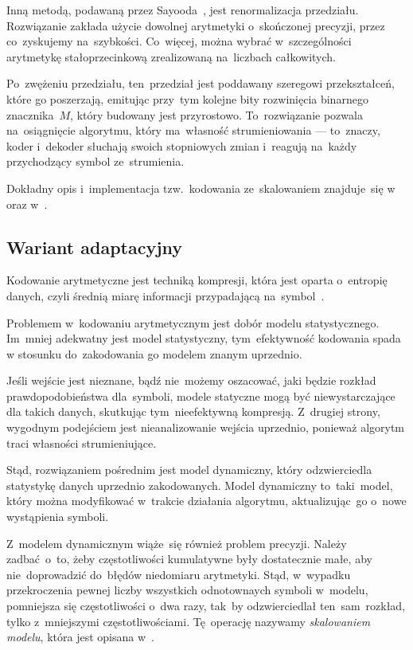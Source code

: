 \documentclass[../../praca.tex]{subfiles}
\begin{document}
Inną metodą, podawaną przez Sayooda~\cite{Sayood:IDC}, jest renormalizacja przedziału.
Rozwiązanie zakłada użycie dowolnej arytmetyki o~skończonej precyzji, przez 
co~zyskujemy na~szybkości. Co~więcej, można wybrać w~szczególności arytmetykę stałoprzecinkową zrealizowaną 
na~liczbach całkowitych. 

Po~zwężeniu przedziału, ten~przedział jest poddawany
szeregowi przekształceń, które go poszerzają, emitując przy~tym kolejne bity
rozwinięcia binarnego znacznika~\( M \), który budowany jest przyrostowo.
To~rozwiązanie pozwala na~osiągnięcie algorytmu, który ma~własność strumieniowania
--- to~znaczy, koder i~dekoder słuchają swoich stopniowych zmian i~reagują na~każdy
przychodzący symbol ze~strumienia. 

Dokładny opis i~implementacja tzw.~kodowania ze~skalowaniem znajduje~się 
w~\cite{Sayood:IDC} oraz w~\cite{Witten:AC}.

\subsection{Wariant adaptacyjny}

Kodowanie arytmetyczne jest techniką kompresji, która jest oparta o~entropię danych,
czyli średnią miarę informacji przypadającą na~symbol~\cite{Sayood:IDC}. 

Problemem w~kodowaniu arytmetycznym jest dobór modelu statystycznego. 
Im~mniej adekwatny jest model statystyczny, tym~efektywność kodowania
spada w stosunku do~zakodowania go modelem znanym uprzednio. 

Jeśli wejście jest nieznane, bądź nie~możemy oszacować, jaki
będzie rozkład prawdopodobieństwa dla~symboli, modele statyczne
mogą być niewystarczające dla takich danych, skutkując tym~nieefektywną kompresją.
Z~drugiej strony, wygodnym podejściem jest nieanalizowanie wejścia uprzednio, ponieważ
algorytm traci własności strumieniujące.

Stąd, rozwiązaniem pośrednim jest model dynamiczny, który odzwierciedla 
statystykę danych uprzednio zakodowanych. Model dynamiczny to~taki~model,
który można modyfikować w~trakcie działania algorytmu, aktualizując~go
o~nowe wystąpienia symboli. 

Z~modelem dynamicznym wiąże~się również problem precyzji. Należy zadbać~o~to, 
żeby częstotliwości kumulatywne były dostatecznie małe, aby
nie~doprowadzić do~błędów niedomiaru arytmetyki. Stąd, w~wypadku
przekroczenia pewnej liczby wszystkich odnotownaych symboli w~modelu,
pomniejsza się częstotliwości o~dwa razy, tak~by odzwierciedlał 
ten~sam~rozkład, tylko z~mniejszymi częstotliwościami. Tę~operację
nazywamy \emph{skalowaniem modelu}, która jest opisana w~\cite{Witten:AC}.
\end{document}
